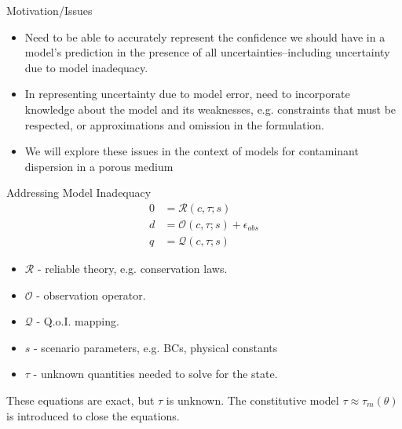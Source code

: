 \begin{frame}{Motivation/Issues}
  \begin{itemize}
    \item Need to be able to accurately represent the confidence we should have in a model's prediction in the presence of all uncertainties--including uncertainty due to model inadequacy.
    \item In representing uncertainty due to model error, need to incorporate knowledge about the model and its weaknesses, e.g. constraints that must be respected, or approximations and omission in the formulation.
\item We will explore these issues in the context of models for contaminant
  dispersion in a porous medium
  \end{itemize}
\end{frame}

\begin{frame}{Addressing Model Inadequacy}
  \vspace{-1em}
  \begin{align*}
    0 &= \mathcal{R}( c, \tau; s )\\
    d &= \mathcal{O}(c, \tau; s ) + \epsilon_{obs}\\
    q &= \mathcal{Q}(c, \tau; s )
  \end{align*}
  \vspace{-1em}
  \begin{itemize}
    \item $\mathcal{R}$ - reliable theory, e.g. conservation laws.\vspace{-.5em}
    \item $\mathcal{O}$ - observation operator.\vspace{-.5em}
    \item $\mathcal{Q}$ - Q.o.I. mapping. \vspace{-.5em}
    \item $s$ - scenario parameters, e.g. BCs, physical constants\vspace{-.5em}
    \item $\tau$ - unknown quantities needed to solve for the state.
  \end{itemize}
    These equations are exact, but $\tau$ is unknown. The constitutive model $\tau\approx\tau_m(\theta)$ is introduced to close the equations.
\end{frame}


